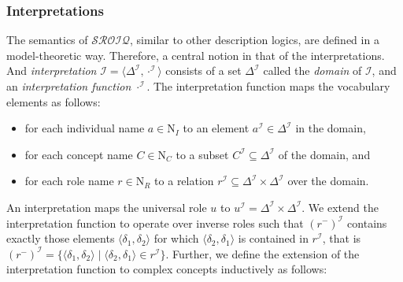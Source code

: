 \subsubsection{Interpretations} \label{interpretations}

The semantics of $\mathcal{SROIQ}$, similar to other description logics, are defined in a model-theoretic way. Therefore, a central notion in that of the interpretations. And \emph{interpretation} $\mathcal{I} = \langle \Delta^\mathcal{I}, \cdot^\mathcal{I} \rangle$ consists of a set $\Delta^\mathcal{I}$ called the \emph{domain} of $\mathcal{I}$, and an \emph{interpretation function} $\cdot^\mathcal{I}$. The interpretation function maps the vocabulary elements as follows:

\begin{itemize}
    \item for each individual name $a \in \mathrm{N}_I$ to an element $a^\mathcal{I} \in \Delta^\mathcal{I}$ in the domain,
    \item for each concept name $C \in \mathrm{N}_C$ to a subset $C^\mathcal{I} \subseteq \Delta^\mathcal{I}$ of the domain, and
    \item for each role name $r \in \mathrm{N}_R$ to a relation $r^\mathcal{I} \subseteq \Delta^\mathcal{I} \times \Delta^\mathcal{I}$ over the domain.
\end{itemize}

An interpretation maps the universal role $u$ to $u^\mathcal{I} = \Delta^\mathcal{I} \times \Delta^\mathcal{I}$.  We extend the interpretation function to operate over inverse roles such that  $\left(r^-\right)^\mathcal{I}$ contains exactly those elements $\langle \delta_1, \delta_2 \rangle$ for which $\langle \delta_2, \delta_1 \rangle$ is contained in $r^\mathcal{I}$, that is  $\left(r^-\right)^\mathcal{I} = \{ \langle \delta_1, \delta_2 \rangle \mid \langle \delta_2, \delta_1 \rangle \in r^\mathcal{I} \}$. Further, we define the extension of the interpretation function to complex concepts inductively as follows:

